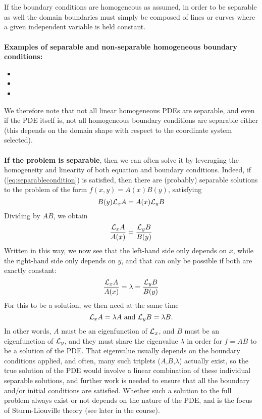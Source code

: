 \\
\\
If the boundary conditions are homogeneous as assumed, in order to be separable as well the domain boundaries must simply be composed of lines or curves where a given independent variable is held constant.
\\
\\
{\bf Examples of separable and non-separable homogeneous boundary conditions:}
\begin{itemize}
\item  
\item 
\item
\end{itemize}
We therefore note that not all linear homogeneous PDEs are separable, and even if the PDE itself is, not all homogeneous boundary conditions are separable either (this depends on the domain shape with respect to the coordinate system selected). 
\\
\\
{\bf If the problem is separable}, then we can often solve it by leveraging the homogeneity and linearity of both equation and boundary conditions.
Indeed, if (\ref{eq:separablecondition}) is satisfied, then there are (probably) separable solutions to the problem of the form $f(x,y) = A(x) B(y)$, satisfying
\begin{equation}
B(y) {\cal L}_x A = A(x){\cal L}_y B
\end{equation}
Dividing by $AB$, we obtain \begin{equation}
\frac{ {\cal L}_x A}{A(x)} = \frac{{\cal L}_y B}{B(y)}
\end{equation}
Written in this way, we now see that the left-hand side only depends on $x$, while the right-hand side only depends on $y$, and that can only be possible if both are exactly constant: 
\begin{equation}
\frac{ {\cal L}_x A}{A(x)} = \lambda = \frac{{\cal L}_y B}{B(y)}
\end{equation} 
For this to be a solution, we then need at the same time
\begin{equation}
{\cal L}_x A = \lambda A \mbox{ and  }{\cal L}_y B = \lambda B. 
\end{equation}
In other words, $A$ must be an eigenfunction of ${\cal L}_x$, and $B$ must be an eigenfunction of ${\cal L}_y$, and they must share the eigenvalue $\lambda$ in order for $f = AB$ to be a solution of the PDE. That eigenvalue usually depends on the boundary conditions applied, and 
often, many such triplets ($A$,$B$,$\lambda$) actually exist, so the true solution of the PDE would involve a linear combination of these individual separable solutions, and further work is needed to ensure that all the boundary and/or initial conditions are satisfied. Whether such a solution to the full problem always exist or not depends on the nature of the PDE, and is the focus of Sturm-Liouville theory (see later in the course). 

